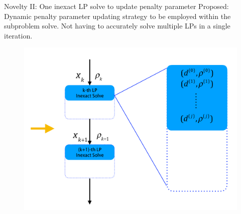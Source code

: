 \documentclass[8pt]{beamer}
\begin{document}
	\begin{frame}[c]{Novelty II: One inexact LP solve to update penalty parameter}
		\vfill
		{\red  \leftpointright Proposed: } 
		Dynamic penalty parameter updating strategy to be employed within the subproblem solve. Not having to accurately solve multiple LPs in a single iteration.
		\vfill
		\begin{figure}[H]
			\includegraphics[height=0.8\textheight]{pic/dynamicupdate}
		\end{figure}
	\end{frame}
\end{document}
